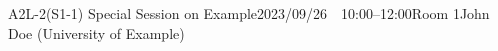 \begin{session}{A2L-2}{(S1-1) Special Session on Example}{2023/09/26~~10:00--12:00}{Room 1}{John Doe (University of Example)}
\end{session}
